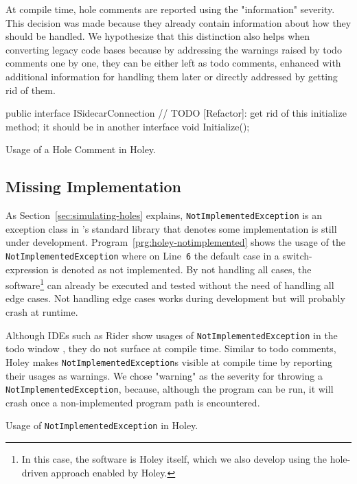 At compile time, hole comments are reported using the "information" severity.
This decision was made because they already contain information about how they should be handled.
We hypothesize that this distinction also helps when converting legacy code bases because by addressing the warnings raised by todo comments one by one, they can be either left as todo comments, enhanced with additional information for handling them later or directly addressed by getting rid of them.

\begin{program}[ht]
\begin{CsCode}
public interface ISidecarConnection
{
	// TODO [Refactor]: get rid of this initialize method; it should be in another interface
	void Initialize();
}
\end{CsCode}
\caption{Usage of a Hole Comment in Holey.}
\label{prg:holey-hole-comment}
\end{program}

\subsection{Missing Implementation}
As Section~\ref{sec:simulating-holes} explains, \texttt{NotImplementedException} is an exception class in \CS's standard library that denotes some implementation is still under development.
Program~\ref{prg:holey-notimplemented} shows the usage of the \texttt{NotImplementedException} where on Line~\verb|6| the default case in a switch-expression is denoted as not implemented.
By not handling all cases, the software\footnote{In this case, the software is Holey itself, which we also develop using the hole-driven approach enabled by Holey.} can already be executed and tested without the need of handling all edge cases.
Not handling edge cases works during development but will probably crash at runtime.

Although IDEs such as Rider show usages of \texttt{NotImplementedException} in the todo window \cite{jetbrains_todo_2023}, they do not surface at compile time.
Similar to todo comments, Holey makes \texttt{NotImplementedException}s visible at compile time by reporting their usages as warnings.
We chose "warning" as the severity for throwing a \texttt{NotImplementedException}, because, although the program can be run, it will crash once a non-implemented program path is encountered.

\begin{program}[ht]
\caption{Usage of \texttt{NotImplementedException} in Holey.}
\label{prg:holey-notimplemented}
\end{program}

